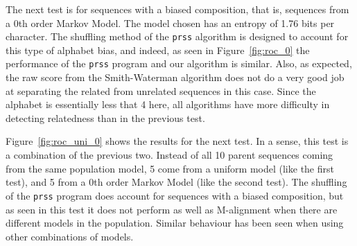 \documentclass[letterpaper,11pt,oneside]{article}
\begin{document}
The next test is for sequences with a biased composition, that is, sequences
from a 0th order Markov Model.  The model chosen has an entropy of 1.76 bits
per character.  The shuffling method of the \verb!prss! algorithm is designed
to account for this type of alphabet bias, and indeed, as seen in
Figure~\ref{fig:roc_0} the performance of the \verb!prss! program and our
algorithm is similar.  Also, as expected, the raw score from the
Smith-Waterman algorithm does not do a very good job at separating the related
from unrelated sequences in this case.  Since the alphabet is essentially less
that 4 here, all algorithms have more difficulty in detecting relatedness than
in the previous test.


Figure~\ref{fig:roc_uni_0} shows the results for the next test.  In a sense,
this test is a combination of the previous two.  Instead of all 10 parent
sequences coming from the same population model, 5 come from a uniform model
(like the first test), and 5 from a 0th order Markov Model (like the second
test).  The shuffling of the \verb!prss! program does account for sequences
with a biased composition, but as seen in this test it does not perform as
well as M-alignment when there are different models in the population.
Similar behaviour has been seen when using other combinations of models.

\end{document}
